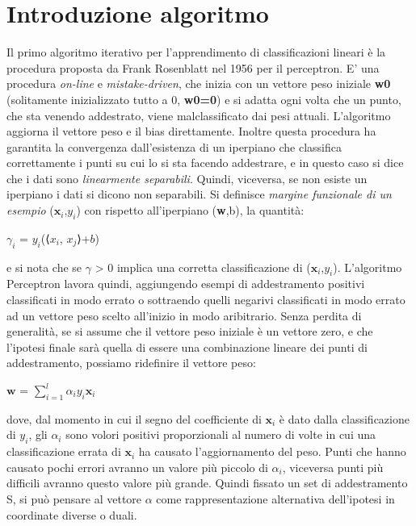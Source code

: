 \documentclass{article}
\begin{document}
    \section{Introduzione algoritmo}
    Il primo algoritmo iterativo per l'apprendimento di classificazioni lineari è la procedura proposta da Frank Rosenblatt nel 1956 per il perceptron. E' una procedura \textit{on-line} e \textit{mistake-driven},
    che inizia con un vettore peso iniziale \textbf{w0} (solitamente inizializzato tutto a 0, \textbf{w0=0}) e si adatta ogni volta che un punto, che sta venendo addestrato, viene malclassificato dai pesi attuali.
    L'algoritmo aggiorna il vettore peso e il bias direttamente. Inoltre questa procedura ha garantita la convergenza dall'esistenza di un iperpiano che classifica correttamente i punti su cui lo si sta facendo addestrare, e in questo
    caso si dice che i dati sono \textit{linearmente separabili}. Quindi, viceversa, se non esiste un iperpiano i dati si dicono non separabili. Si definisce \textit{margine funzionale di un esempio} ({$\textbf{x}_i$},$y_i$) con rispetto all'iperpiano (\textbf{w},b), la quantità:
    \begin{center}
        $\gamma_i$ = $y_i$(⟨$x_i$, $x_j$⟩+$b$) 
    \end{center}
    e si nota che se $\gamma$ > 0 implica una corretta classificazione di ({$\textbf{x}_i$},$y_i$).
    L'algoritmo Perceptron lavora quindi, aggiungendo esempi di addestramento positivi classificati in modo errato o sottraendo quelli negarivi classificati in modo errato ad un vettore peso scelto all'inizio in modo aribitrario.
    Senza perdita di generalità, se si assume che il vettore peso iniziale è un vettore zero, e che l'ipotesi finale sarà quella di essere una combinazione lineare dei punti di addestramento, possiamo ridefinire il vettore peso: 
    \begin{center}
        $\textbf{w}$ = $\displaystyle\sum_{i=1}^l \alpha_iy_i\textbf{x}_i$
    \end{center}
    dove, dal momento in cui il segno del coefficiente di $\textbf{x}_i$ è dato dalla classificazione di $y_i$, gli $\alpha_i$ sono volori positivi proporzionali al numero di volte in cui una classificazione errata di $\textbf{x}_i$ ha causato l'aggiornamento del peso.
    Punti che hanno causato pochi errori avranno un valore più piccolo di $\alpha_i$, viceversa punti più difficili avranno questo valore più grande.
    Quindi fissato un set di addestramento S, si può pensare al vettore \textbf{$\alpha$} come rappresentazione alternativa dell'ipotesi in coordinate diverse o duali.
    \newpage
\end{document}

